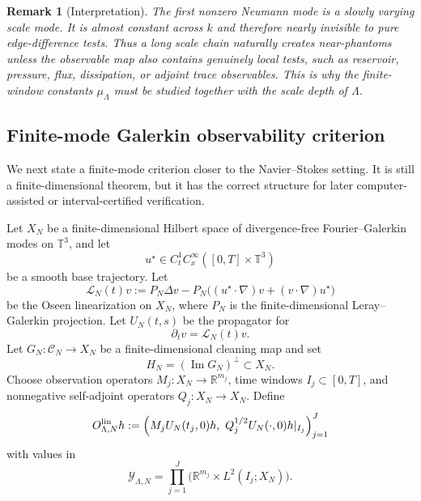 \documentclass[11pt]{article}
\numberwithin{equation}{section}
\newtheorem{remark}[theorem]{Remark}
\newcommand{\R}{\mathbb R}
\newcommand{\calC}{\mathcal C}
\newcommand{\calY}{\mathcal Y}
\newcommand{\Image}{\operatorname{Im}}
\begin{document}
\begin{remark}[Interpretation]
The first nonzero Neumann mode is a slowly varying scale mode.  It is almost constant across $k$ and therefore nearly invisible to pure edge-difference tests.  Thus a long scale chain naturally creates near-phantoms unless the observable map also contains genuinely local tests, such as reservoir, pressure, flux, dissipation, or adjoint trace observables.  This is why the finite-window constants $\mu_\Lambda$ must be studied together with the scale depth of $\Lambda$.
\end{remark}

\subsection{Finite-mode Galerkin observability criterion}

We next state a finite-mode criterion closer to the Navier--Stokes setting.  It is still a finite-dimensional theorem, but it has the correct structure for later computer-assisted or interval-certified verification.

Let $X_N$ be a finite-dimensional Hilbert space of divergence-free Fourier--Galerkin modes on $\mathbb T^3$, and let
\[
    u^\star\in C^1_tC^\infty_x([0,T]\times\mathbb T^3)
\]
be a smooth base trajectory.  Let
\[
    \mathcal L_N(t)v
    :=
    P_N\Delta v
    -P_N\bigl((u^\star\cdot\nabla)v+(v\cdot\nabla)u^\star\bigr)
\]
be the Oseen linearization on $X_N$, where $P_N$ is the finite-dimensional Leray--Galerkin projection.  Let $U_N(t,s)$ be the propagator for
\[
    \partial_t v=\mathcal L_N(t)v.
\]
Let $G_N:\calC_N\to X_N$ be a finite-dimensional cleaning map and set
\[
    H_N=(\Image G_N)^\perp\subset X_N.
\]
Choose observation operators $M_j:X_N\to\R^{m_j}$, time windows $I_j\subset[0,T]$, and nonnegative self-adjoint operators $Q_j:X_N\to X_N$.  Define
\[
    O^{\rm lin}_{\Lambda,N}h
    :=
    \left(
        M_jU_N(t_j,0)h,
        \ Q_j^{1/2}U_N(\cdot,0)h|_{I_j}
    \right)_{j=1}^J
\]
with values in
\[
    \calY_{\Lambda,N}
    =
    \prod_{j=1}^J
    \bigl(\R^{m_j}\times L^2(I_j;X_N)\bigr).
\]
\end{document}
